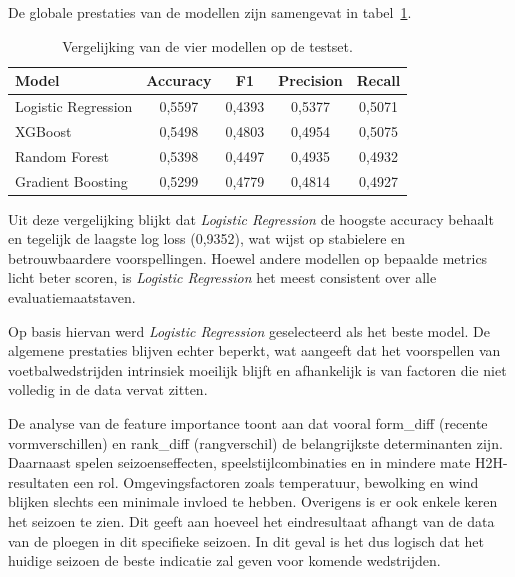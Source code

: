 \vspace{6pt}

De globale prestaties van de modellen zijn samengevat in tabel~\ref{tab:modelvergelijking}.

\begin{table}[h!]
\centering
\begin{tabular}{lcccc}
\hline
\textbf{Model} & \textbf{Accuracy} & \textbf{F1} & \textbf{Precision} & \textbf{Recall} \\
\hline
Logistic Regression & 0{,}5597 & 0{,}4393 & 0{,}5377 & 0{,}5071 \\
XGBoost             & 0{,}5498 & 0{,}4803 & 0{,}4954 & 0{,}5075 \\
Random Forest       & 0{,}5398 & 0{,}4497 & 0{,}4935 & 0{,}4932 \\
Gradient Boosting   & 0{,}5299 & 0{,}4779 & 0{,}4814 & 0{,}4927 \\
\hline
\end{tabular}
\caption{Vergelijking van de vier modellen op de testset.}
\label{tab:modelvergelijking}
\end{table}

Uit deze vergelijking blijkt dat \textit{Logistic Regression} de hoogste accuracy behaalt en tegelijk de laagste log loss (0,9352), wat wijst op stabielere en betrouwbaardere voorspellingen.
Hoewel andere modellen op bepaalde metrics licht beter scoren, is \textit{Logistic Regression} het meest consistent over alle evaluatiemaatstaven.

\vspace{5pt}

Op basis hiervan werd \textit{Logistic Regression} geselecteerd als het beste model.
De algemene prestaties blijven echter beperkt, wat aangeeft dat het voorspellen van voetbalwedstrijden intrinsiek moeilijk blijft en afhankelijk is van factoren die niet volledig in de data vervat zitten.

\vspace{5pt}

De analyse van de feature importance toont aan dat vooral form\_diff (recente vormverschillen) en rank\_diff (rangverschil) de belangrijkste determinanten zijn.
Daarnaast spelen seizoenseffecten, speelstijlcombinaties en in mindere mate H2H-resultaten een rol.
Omgevingsfactoren zoals temperatuur, bewolking en wind blijken slechts een minimale invloed te hebben.
Overigens is er ook enkele keren het seizoen te zien. Dit geeft aan hoeveel het eindresultaat afhangt van de data van de ploegen in dit specifieke seizoen.
In dit geval is het dus logisch dat het huidige seizoen de beste indicatie zal geven voor komende wedstrijden.

